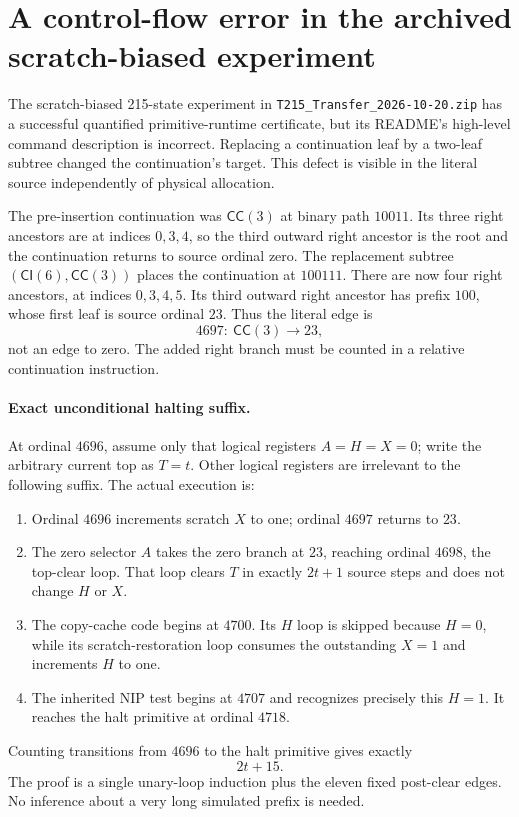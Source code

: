 \section{A control-flow error in the archived scratch-biased experiment}
\label{sec:scratch-correction}

The scratch-biased 215-state experiment in
\texttt{T215\_Transfer\_2026-10-20.zip} has a successful quantified
primitive-runtime certificate, but its README's high-level command
description is incorrect. Replacing a continuation leaf by a two-leaf
subtree changed the continuation's target. This defect is visible in
the literal source independently of physical allocation.

The pre-insertion continuation was $\mathsf{CC}(3)$ at binary path
$10011$. Its three right ancestors are at indices $0,3,4$, so the
third outward right ancestor is the root and the continuation returns
to source ordinal zero. The replacement subtree
$(\mathsf{CI}(6),\mathsf{CC}(3))$ places the continuation at $100111$.
There are now four right ancestors, at indices $0,3,4,5$. Its third
outward right ancestor has prefix $100$, whose first leaf is source
ordinal $23$. Thus the literal edge is
\[
       4697:\ \mathsf{CC}(3)\longrightarrow23,
\]
not an edge to zero. The added right branch must be counted in a
relative continuation instruction.

\paragraph{Exact unconditional halting suffix.}
At ordinal $4696$, assume only that logical registers
$A=H=X=0$; write the arbitrary current top as $T=t$. Other logical
registers are irrelevant to the following suffix. The actual execution
is:
\begin{enumerate}
 \item Ordinal $4696$ increments scratch $X$ to one; ordinal $4697$
 returns to $23$.
 \item The zero selector $A$ takes the zero branch at $23$, reaching
 ordinal $4698$, the top-clear loop. That loop clears $T$ in exactly
 $2t+1$ source steps and does not change $H$ or $X$.
 \item The copy-cache code begins at $4700$. Its $H$ loop is skipped
 because $H=0$, while its scratch-restoration loop consumes the
 outstanding $X=1$ and increments $H$ to one.
 \item The inherited NIP test begins at $4707$ and recognizes
 precisely this $H=1$. It reaches the halt primitive at ordinal
 $4718$.
\end{enumerate}
Counting transitions from $4696$ to the halt primitive gives exactly
\[
                            2t+15.
\]
The proof is a single unary-loop induction plus the eleven fixed
post-clear edges. No inference about a very long simulated prefix is
needed.

